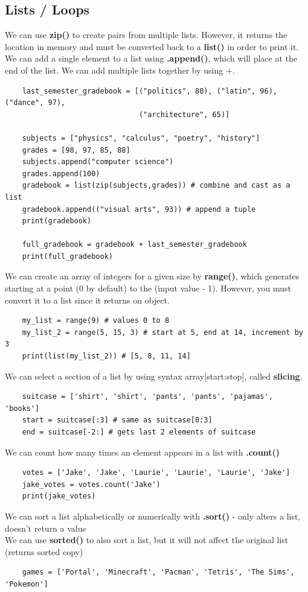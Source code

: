\documentclass[11pt, a4paper]{article}
\begin{document}
\begin{spacing}{1.1}
	\subsection{Lists / Loops}
	We can use \textbf{zip()} to create pairs from multiple lists. However, it returns the location in memory and must be converted back to a \textbf{list()} in order to print it. We can add a single element to a list using \textbf{.append()}, which will place at the end of the list. We can add multiple lists together by using $\bm{+}$.
	\begin{lstlisting}
	last_semester_gradebook = [("politics", 80), ("latin", 96), ("dance", 97), 
	                           ("architecture", 65)]
	
	subjects = ["physics", "calculus", "poetry", "history"]
	grades = [98, 97, 85, 88]
	subjects.append("computer science")
	grades.append(100)
	gradebook = list(zip(subjects,grades)) # combine and cast as a list
	gradebook.append(("visual arts", 93)) # append a tuple
	print(gradebook)
	
	full_gradebook = gradebook + last_semester_gradebook
	print(full_gradebook) \end{lstlisting}\vspace*{1mm}
	We can create an array of integers for a given size by \textbf{range()}, which generates starting at a point (0 by default) to the (input value - 1). However, you must convert it to a list since it returns on object.
	\begin{lstlisting}
	my_list = range(9) # values 0 to 8
	my_list_2 = range(5, 15, 3) # start at 5, end at 14, increment by 3
	print(list(my_list_2)) # [5, 8, 11, 14] \end{lstlisting}\vspace*{1mm}
	We can select a section of a list by using syntax array[start:stop], called \textbf{slicing}. 
	\begin{lstlisting}
	suitcase = ['shirt', 'shirt', 'pants', 'pants', 'pajamas', 'books']
	start = suitcase[:3] # same as suitcase[0:3]
	end = suitcase[-2:] # gets last 2 elements of suitcase \end{lstlisting}\vspace*{1mm}
	We can count how many times an element appears in a list with \textbf{.count()}
	\begin{lstlisting}
	votes = ['Jake', 'Jake', 'Laurie', 'Laurie', 'Laurie', 'Jake']
	jake_votes = votes.count('Jake')
	print(jake_votes) \end{lstlisting}\vspace*{1mm}
	We can sort a list alphabetically or numerically with \textbf{.sort()} - only alters a list, doesn't return a value \\
	We can use \textbf{sorted()} to also sort a list, but it will not affect the original list (returns sorted copy)
	\begin{lstlisting}
	games = ['Portal', 'Minecraft', 'Pacman', 'Tetris', 'The Sims', 'Pokemon']
	

\end{lstlisting}
\end{spacing}
\end{document}
